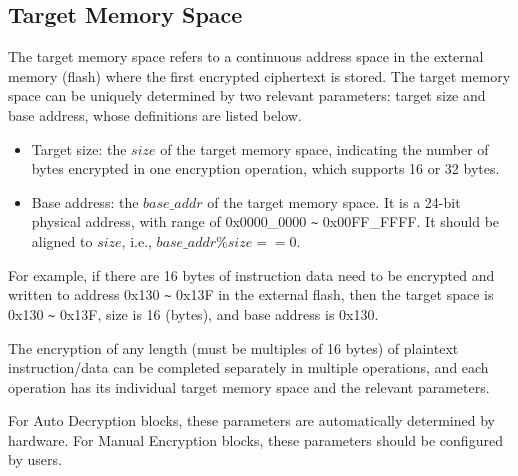 \documentclass[main\_\_EN.tex]{subfiles}
\begin{document}




\subsection{Target Memory Space}
\label{sec:extmemencr-target-space}

The target memory space refers to a continuous address space in the external memory (flash) where the first encrypted ciphertext is stored. The target memory space can be uniquely determined by two relevant parameters: target size and base address, whose definitions are listed below.

\begin{itemize}
    \item Target size: the \begin{math} size \end{math} of the target memory space, indicating the number of bytes encrypted in one encryption operation, which supports 16 or 32 bytes.
    \item Base address: the \begin{math} base\_addr\end{math} of the target memory space. It is a 24-bit physical address, with range of 0x0000\_0000 \verb+~+ 0x00FF\_FFFF. It should be aligned to \begin{math} size \end{math}, i.e., \begin{math} base\_addr \% size == 0 \end{math}.
\end{itemize}

For example, if there are 16 bytes of instruction data need to be encrypted and written to address 0x130 \verb+~+ 0x13F in the external flash, then the target space is 0x130 \verb+~+ 0x13F, size is 16 (bytes), and base address is 0x130.

The encryption of any length (must be multiples of 16 bytes) of plaintext instruction/data can be completed separately in multiple operations, and each operation has its individual target memory space and the relevant parameters.

For Auto Decryption blocks, these parameters are automatically determined by hardware. For Manual Encryption blocks, these parameters should be configured by users.
\end{document}
